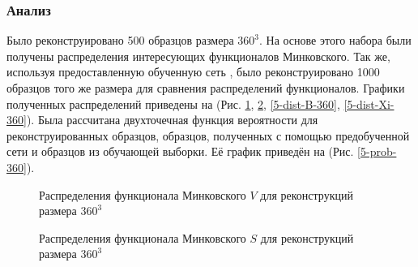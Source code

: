 		\subsubsection{Анализ}
			Было реконструировано 500 образцов размера $360^3$. На основе этого набора были получены распределения интересующих функционалов Минковского. Так же, используя предоставленную обученную сеть \cite{Mosser}, было реконструировано 1000 образцов того же размера для сравнения распределений функционалов. Графики полученных распределений приведены на (Рис. \ref{5-dist-V-360}, \ref{5-dist-S-360}, \ref{5-dist-B-360}, \ref{5-dist-Xi-360}). Была рассчитана двухточечная функция вероятности для реконструированных образцов, образцов, полученных с помощью предобученной сети \cite{Mosser} и образцов из обучающей выборки. Её график приведён на (Рис. \ref{5-prob-360}).
			
			\begin{figure}[h]
				\begin{minipage}[h]{0.49\linewidth}
				\end{minipage}
				\hfill
				\begin{minipage}[h]{0.49\linewidth}
				\end{minipage}
				\caption{Распределения функционала Минковского $V$ для реконструкций размера $360^3$}
				\label{5-dist-V-360}
			\end{figure}
			
			\begin{figure}[h]
				\begin{minipage}[h]{0.49\linewidth}
				\end{minipage}
				\hfill
				\begin{minipage}[h]{0.49\linewidth}
				\end{minipage}
				\caption{Распределения функционала Минковского $S$ для реконструкций размера $360^3$}
				\label{5-dist-S-360}
			\end{figure}
			
